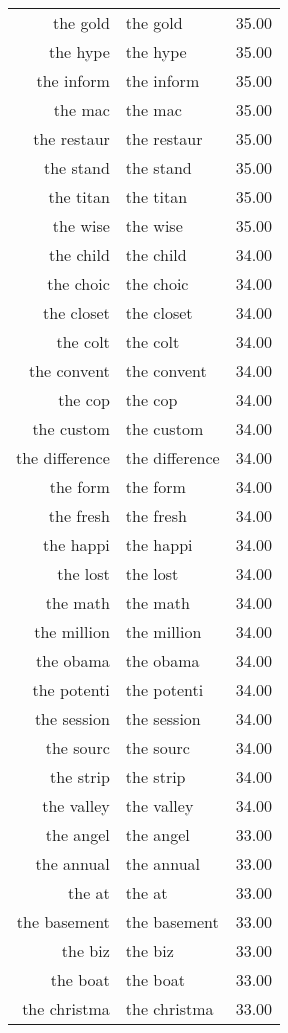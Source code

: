 \begin{table}[ht]
\begin{tabular}{rlr}
  the gold & the gold & 35.00 \\ 
  the hype & the hype & 35.00 \\ 
  the inform & the inform & 35.00 \\ 
  the mac & the mac & 35.00 \\ 
  the restaur & the restaur & 35.00 \\ 
  the stand & the stand & 35.00 \\ 
  the titan & the titan & 35.00 \\ 
  the wise & the wise & 35.00 \\ 
  the child & the child & 34.00 \\ 
  the choic & the choic & 34.00 \\ 
  the closet & the closet & 34.00 \\ 
  the colt & the colt & 34.00 \\ 
  the convent & the convent & 34.00 \\ 
  the cop & the cop & 34.00 \\ 
  the custom & the custom & 34.00 \\ 
  the difference & the difference & 34.00 \\ 
  the form & the form & 34.00 \\ 
  the fresh & the fresh & 34.00 \\ 
  the happi & the happi & 34.00 \\ 
  the lost & the lost & 34.00 \\ 
  the math & the math & 34.00 \\ 
  the million & the million & 34.00 \\ 
  the obama & the obama & 34.00 \\ 
  the potenti & the potenti & 34.00 \\ 
  the session & the session & 34.00 \\ 
  the sourc & the sourc & 34.00 \\ 
  the strip & the strip & 34.00 \\ 
  the valley & the valley & 34.00 \\ 
  the angel & the angel & 33.00 \\ 
  the annual & the annual & 33.00 \\ 
  the at & the at & 33.00 \\ 
  the basement & the basement & 33.00 \\ 
  the biz & the biz & 33.00 \\ 
  the boat & the boat & 33.00 \\ 
  the christma & the christma & 33.00 \\ 

\end{tabular}
\end{table}
